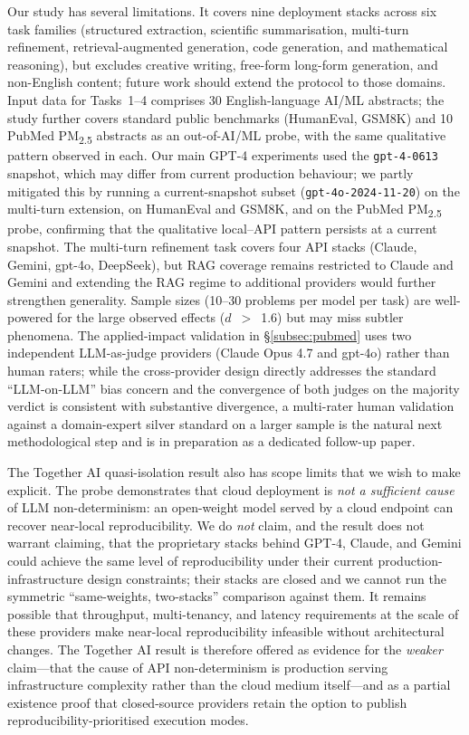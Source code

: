 \documentclass[sn-nature]{sn-jnl}
\begin{document}
Our study has several limitations.
It covers nine deployment stacks across six task families (structured extraction, scientific summarisation, multi-turn refinement, retrieval-augmented generation, code generation, and mathematical reasoning), but excludes creative writing, free-form long-form generation, and non-English content; future work should extend the protocol to those domains.
Input data for Tasks~1--4 comprises 30 English-language AI/ML abstracts; the study further covers standard public benchmarks (HumanEval, GSM8K) and 10 PubMed PM\textsubscript{2.5} abstracts as an out-of-AI/ML probe, with the same qualitative pattern observed in each.
Our main GPT-4 experiments used the \texttt{gpt-4-0613} snapshot, which may differ from current production behaviour; we partly mitigated this by running a current-snapshot subset (\texttt{gpt-4o-2024-11-20}) on the multi-turn extension, on HumanEval and GSM8K, and on the PubMed PM\textsubscript{2.5} probe, confirming that the qualitative local--API pattern persists at a current snapshot.
The multi-turn refinement task covers four API stacks (Claude, Gemini, gpt-4o, DeepSeek), but RAG coverage remains restricted to Claude and Gemini and extending the RAG regime to additional providers would further strengthen generality.
Sample sizes (10--30 problems per model per task) are well-powered for the large observed effects ($d$~$>$~1.6) but may miss subtler phenomena.
The applied-impact validation in §\ref{subsec:pubmed} uses two independent LLM-as-judge providers (Claude Opus 4.7 and gpt-4o) rather than human raters; while the cross-provider design directly addresses the standard ``LLM-on-LLM'' bias concern and the convergence of both judges on the majority verdict is consistent with substantive divergence, a multi-rater human validation against a domain-expert silver standard on a larger sample is the natural next methodological step and is in preparation as a dedicated follow-up paper.

The Together AI quasi-isolation result also has scope limits that we wish to make explicit.
The probe demonstrates that cloud deployment is \emph{not a sufficient cause} of LLM non-determinism: an open-weight model served by a cloud endpoint can recover near-local reproducibility.
We do \emph{not} claim, and the result does not warrant claiming, that the proprietary stacks behind GPT-4, Claude, and Gemini could achieve the same level of reproducibility under their current production-infrastructure design constraints; their stacks are closed and we cannot run the symmetric ``same-weights, two-stacks'' comparison against them.
It remains possible that throughput, multi-tenancy, and latency requirements at the scale of these providers make near-local reproducibility infeasible without architectural changes.
The Together AI result is therefore offered as evidence for the \emph{weaker} claim---that the cause of API non-determinism is production serving infrastructure complexity rather than the cloud medium itself---and as a partial existence proof that closed-source providers retain the option to publish reproducibility-prioritised execution modes.
\end{document}
